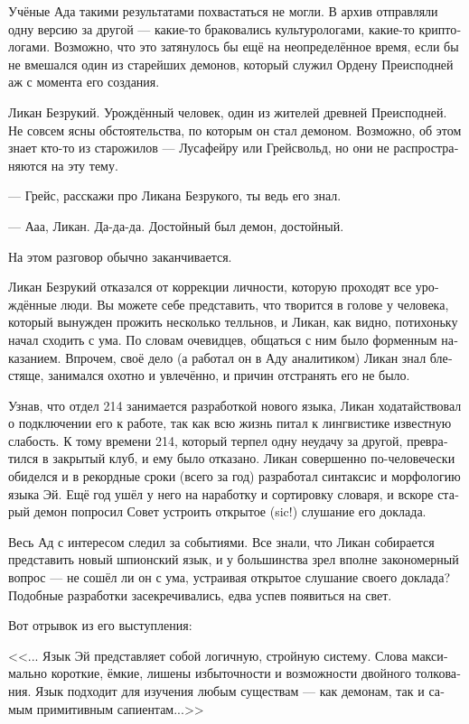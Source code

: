 \documentclass[a4paper,12pt,fleqn]{book}\usepackage{cooltooltips}\usepackage{polyglossia}\setdefaultlanguage[babelshorthands=true]{russian}\setotherlanguage{english}\defaultfontfeatures{Ligatures=TeX,Mapping=tex-text} \usepackage{xcolor}\definecolor{lightgray}{HTML}{bbbbbb}\color{lightgray}\newcommand{\ml}[3]{\textenglish{\textcolor{black}{#3}}}
\begin{document}
{Учёные Ада такими результатами похвастаться не могли.
В архив отправляли одну версию за другой --- какие-то браковались культурологами, какие-то криптологами.
Возможно, что это затянулось бы ещё на неопределённое время, если бы не вмешался один из старейших демонов, который служил Ордену Преисподней аж с момента его создания.

Ликан Безрукий.
Урождённый человек, один из жителей древней Преисподней.
Не совсем ясны обстоятельства, по которым он стал демоном.
Возможно, об этом знает кто-то из старожилов --- Лусафейру или Грейсвольд, но они не распространяются на эту тему.

--- Грейс, расскажи про Ликана Безрукого, ты ведь его знал.

--- Ааа, Ликан.
Да-да-да.
Достойный был демон, достойный.

На этом разговор обычно заканчивается.

Ликан Безрукий отказался от коррекции личности, которую проходят все урождённые люди.
Вы можете себе представить, что творится в голове у человека, который вынужден прожить несколько телльнов, и Ликан, как видно, потихоньку начал сходить с ума.
По словам очевидцев, общаться с ним было форменным наказанием.
Впрочем, своё дело (а работал он в Аду аналитиком) Ликан знал блестяще, занимался охотно и увлечённо, и причин отстранять его не было.

Узнав, что отдел 214 занимается разработкой нового языка, Ликан ходатайствовал о подключении его к работе, так как всю жизнь питал к лингвистике известную слабость.
К тому времени 214, который терпел одну неудачу за другой, превратился в закрытый клуб, и ему было отказано.
Ликан совершенно по-человечески обиделся и в рекордные сроки (всего за год) разработал синтаксис и морфологию языка Эй.
Ещё год ушёл у него на наработку и сортировку словаря, и вскоре старый демон попросил Совет устроить открытое (sic!) слушание его доклада.

Весь Ад с интересом следил за событиями.
Все знали, что Ликан собирается представить новый шпионский язык, и у большинства зрел вполне закономерный вопрос --- не сошёл ли он с ума, устраивая открытое слушание своего доклада?
Подобные разработки засекречивались, едва успев появиться на свет.

Вот отрывок из его выступления:

<<... Язык Эй представляет собой логичную, стройную систему.
Слова максимально короткие, ёмкие, лишены избыточности и возможности двойного толкования.
Язык подходит для изучения любым существам --- как демонам, так и самым примитивным сапиентам...>>

}
\end{document}
